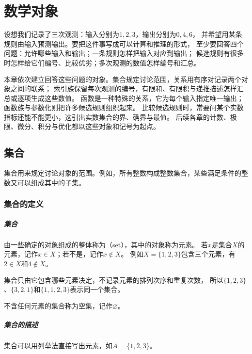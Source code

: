 \chapter{数学对象}
\label{chap:sets-functions-and-proofs}

设想我们记录了三次观测：输入分别为$1,2,3$，输出分别为$0,4,6$，
并希望用某条规则由输入预测输出。要把这件事写成可以计算和推理的形式，
至少要回答四个问题：允许哪些输入和输出；一条规则怎样把输入对应到输出；
候选规则有很多时怎样给它们编号、比较优劣；多次观测的数值怎样编号和汇总。

本章依次建立回答这些问题的对象。集合规定讨论范围，关系用有序对记录两个对象之间的联系；
索引族保留每次观测的编号，有限和、有限积与递推描述怎样汇总或逐项生成这些数值。
函数是一种特殊的关系，它为每个输入指定唯一输出；函数族与参数化则把许多候选规则组织起来。
比较候选规则时，常要问某个实数指标还能不能更小，这引出实数集合的界、确界与最值。
后续各章的计数、极限、微分、积分与优化都以这些对象和记号为起点。

\section{集合}
\label{sec:prelim-sets-relations-functions}

集合用来规定讨论对象的范围。例如，所有整数构成整数集合，某些满足条件的整数又可以组成其中的子集。

\subsection{集合的定义}
\label{sec:prelim-set-definition}

\paragraph{集合}
由一些确定的对象组成的整体称为（set），其中的对象称为元素。
若$x$是集合$X$的元素，记作$x\in X$；若不是，记作$x\notin X$。
例如$X=\{1,2,3\}$包含三个元素，有$2\in X$和$4\notin X$。

集合只由它包含哪些元素决定，不记录元素的排列次序和重复次数，
所以$\{1,2,3\}$、$\{3,2,1\}$和$\{1,1,2,3\}$表示同一个集合。

不含任何元素的集合称为空集，记作$\varnothing$。

\paragraph{集合的描述}
集合可以用列举法直接写出元素，如$A=\{1,2,3\}$。

